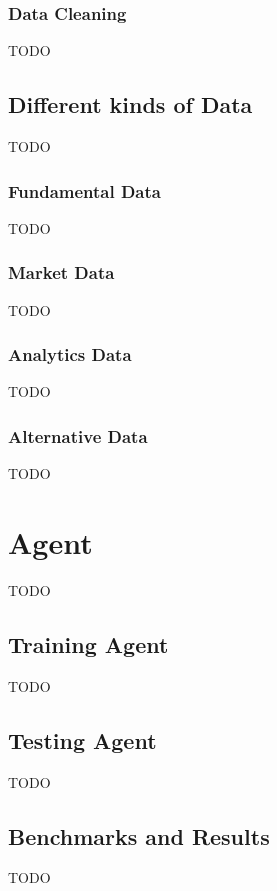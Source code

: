 \subsection{Data Cleaning}\label{subsec:data-cleaning}
TODO


\section{Different kinds of Data}\label{sec:different-kinds-of-data}
TODO

\subsection{Fundamental Data}\label{subsec:fundamental-data}
TODO

\subsection{Market Data}\label{subsec:market-data}
TODO

\subsection{Analytics Data}\label{subsec:analytics-data}
TODO

\subsection{Alternative Data}\label{subsec:alternative-data}
TODO




\chapter{Agent}\label{ch:agent}
TODO


\section{Training Agent}\label{sec:training-agent}
TODO


\section{Testing Agent}\label{sec:testing-agent}
TODO


\section{Benchmarks and Results}\label{sec:benchmarks-and-results}
TODO


